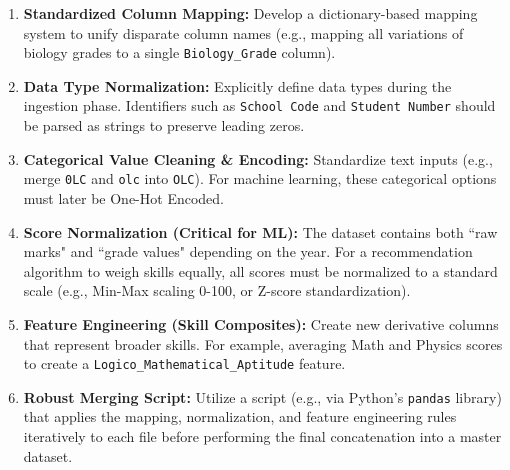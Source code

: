\documentclass{article}
\begin{document}
\begin{enumerate}
    \item \textbf{Standardized Column Mapping:} Develop a dictionary-based mapping system to unify disparate column names (e.g., mapping all variations of biology grades to a single \texttt{Biology\_Grade} column).
    \item \textbf{Data Type Normalization:} Explicitly define data types during the ingestion phase. Identifiers such as \texttt{School Code} and \texttt{Student Number} should be parsed as strings to preserve leading zeros.
    \item \textbf{Categorical Value Cleaning \& Encoding:} Standardize text inputs (e.g., merge \texttt{0LC} and \texttt{olc} into \texttt{OLC}). For machine learning, these categorical options must later be One-Hot Encoded.
    \item \textbf{Score Normalization (Critical for ML):} The dataset contains both ``raw marks" and ``grade values" depending on the year. For a recommendation algorithm to weigh skills equally, all scores must be normalized to a standard scale (e.g., Min-Max scaling 0-100, or Z-score standardization).
    \item \textbf{Feature Engineering (Skill Composites):} Create new derivative columns that represent broader skills. For example, averaging Math and Physics scores to create a \texttt{Logico\_Mathematical\_Aptitude} feature.
    \item \textbf{Robust Merging Script:} Utilize a script (e.g., via Python's \texttt{pandas} library) that applies the mapping, normalization, and feature engineering rules iteratively to each file before performing the final concatenation into a master dataset.
\end{enumerate}
\end{document}
